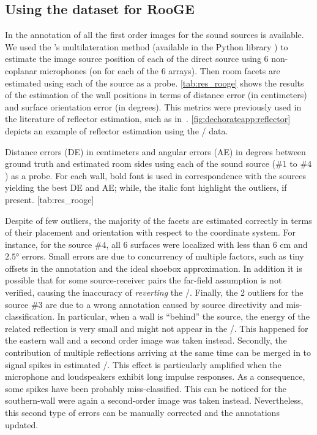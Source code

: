 \subsection{Using the \dEchorate{} dataset for \acs{RooGE}}
In \dEchorate{} the annotation of all the first order images for the sound sources is available.
We used the \citeauthor{Beck2008ExactProblems}'s multilateration method (available in the Python library \dEchorate) to estimate the image source position of each of the direct source using 6 non-coplanar microphones (on for each of the 6 arrays).
Then room facets are estimated using each of the source as a probe.
\cref{tab:res_rooge} shows the results of the estimation of the wall positions in terms of distance error (in centimeters) and surface orientation error (in degrees).
This metrics were previously used in the literature of reflector estimation, such as in~.
\cref{fig:dechorateapp:reflector} depicts an example of reflector estimation using the \DECHORATE/ data.

\begin{table}[h!]
    \begin{sidecaption}[]{
        Distance errors (DE) in centimeters and angular errors (AE) in degrees between ground truth and estimated room sides using each of the sound source ($\#1$ to $\#4$) as a probe. For each wall, bold font is used in correspondence with the sources yielding the best DE and AE; while, the italic font highlight the outliers, if present.
        }[tab:res_rooge]
    \centering
    \small
    
    \end{sidecaption}
\end{table}

\mynewline
Despite of few outliers, the majority of the facets are estimated correctly in terms of their placement and orientation with respect to the coordinate system.
For instance, for the source $\#4$, all 6 surfaces were localized with less than $6$ cm and $\ang{2.5}$ errors.
Small errors are due to concurrency of multiple factors, such as tiny offsets in the annotation and the ideal shoebox approximation.
In addition it is possible that for some source-receiver pairs the far-field assumption is not verified, causing the inaccuracy of \textit{reverting} the \ISM/.
Finally, the 2 outliers for the source \#3 are due to a wrong annotation caused by source directivity and mis-classification.
In particular, when a wall is ``behind'' the source, the energy of the related reflection is very small and might not appear in the \RIRs/.
This happened for the eastern wall and a second order image was taken instead.
Secondly, the contribution of multiple reflections arriving at the same time can be merged in to signal spikes in estimated \RIRs/.
This effect is particularly amplified when the microphone and loudspeakers exhibit long impulse responses.
As a consequence, some spikes have been probably miss-classified.
This can be noticed for the southern-wall were again a second-order image was taken instead.
Nevertheless, this second type of errors can be manually corrected and the annotations updated.

